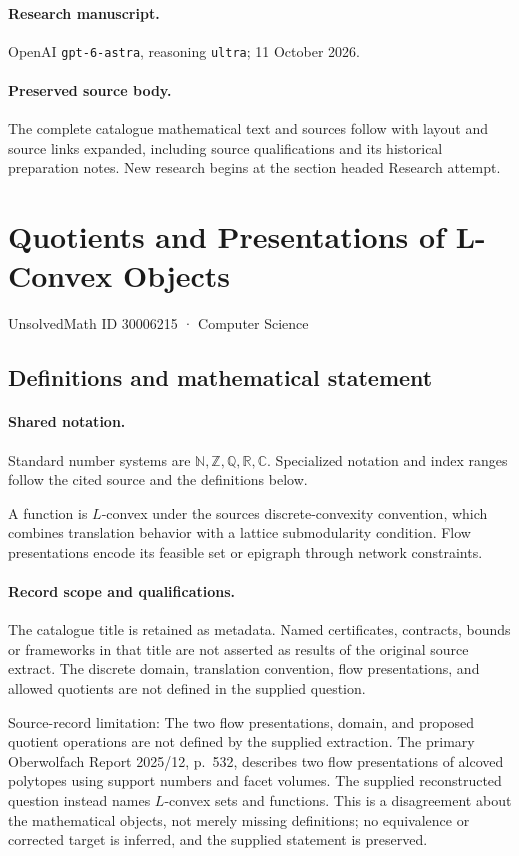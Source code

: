 \documentclass[11pt]{article}
\begin{document}
\paragraph{Research manuscript.} OpenAI \texttt{gpt-6-astra}, reasoning \texttt{ultra}; 11 October 2026.
\paragraph{Preserved source body.} The complete catalogue mathematical text and sources follow with layout and source links expanded, including source qualifications and its historical preparation notes. New research begins at the section headed Research attempt.

\section{Quotients and Presentations of L-Convex Objects}\label{30006215}
{\small UnsolvedMath ID 30006215 · Computer Science}
\subsection{Definitions and mathematical statement}

\paragraph{Shared notation.}Standard number systems are $\mathbb N,\mathbb Z,\mathbb Q,\mathbb R,\mathbb C$. Specialized notation and index ranges follow the cited source and the definitions below.


A function is $L$-convex under the source\textquotesingle s discrete-convexity convention, which combines translation behavior with a lattice submodularity condition. Flow presentations encode its feasible set or epigraph through network constraints.
\paragraph{Record scope and qualifications.}
The catalogue title is retained as metadata. Named certificates, contracts, bounds or frameworks in that title are not asserted as results of the original source extract.
The discrete domain, translation convention, flow presentations, and allowed quotients are not defined in the supplied question.

Source-record limitation: The two flow presentations, domain, and proposed quotient operations are not defined by the supplied extraction. The primary Oberwolfach Report 2025/12, p.\ 532, describes two flow presentations of alcoved polytopes using support numbers and facet volumes. The supplied reconstructed question instead names $L$-convex sets and functions. This is a disagreement about the mathematical objects, not merely missing definitions; no equivalence or corrected target is inferred, and the supplied statement is preserved.
\end{document}
